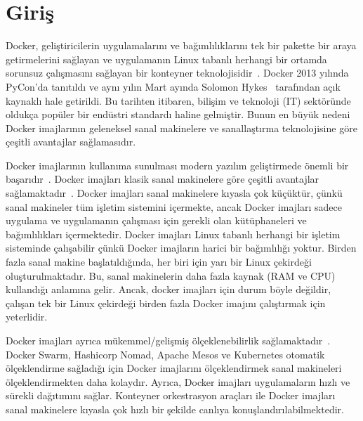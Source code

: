 

\chapter{Giriş}

Docker, geliştiricilerin uygulamalarını ve bağımlılıklarını tek bir pakette bir araya getirmelerini sağlayan ve uygulamanın Linux tabanlı herhangi bir ortamda sorunsuz çalışmasını sağlayan bir konteyner teknolojisidir~\autocite{haque2020challenges}. Docker 2013 yılında PyCon'da tanıtıldı ve aynı yılın Mart ayında Solomon Hykes~\autocite{ThefutureofLinuxContainers} tarafından açık kaynaklı hale getirildi. Bu tarihten itibaren, bilişim ve teknoloji (IT) sektöründe oldukça popüler bir endüstri standardı haline gelmiştir. Bunun en büyük nedeni Docker imajlarının geleneksel sanal makinelere ve sanallaştırma teknolojisine göre çeşitli avantajlar sağlamasıdır.

Docker imajlarının kullanıma sunulması modern yazılım geliştirmede  önemli bir başarıdır~\autocite{prado2022}. Docker imajları klasik sanal makinelere göre çeşitli avantajlar sağlamaktadır~\autocite{zhang2018comparative}. Docker imajları sanal makinelere kıyasla çok küçüktür, çünkü sanal makineler tüm işletim sistemini içermekte, ancak Docker imajları sadece uygulama ve uygulamanın çalışması için gerekli olan kütüphaneleri ve bağımlılıkları içermektedir. Docker imajları Linux tabanlı herhangi bir işletim sisteminde çalışabilir çünkü Docker imajların harici bir bağımlılığı yoktur. Birden fazla sanal makine başlatıldığında, her biri için yarı bir Linux çekirdeği oluşturulmaktadır. Bu, sanal makinelerin daha fazla kaynak (RAM ve CPU) kullandığı anlamına gelir. Ancak, docker imajları için durum böyle değildir, çalışan tek bir Linux çekirdeği birden fazla Docker imajını çalıştırmak için yeterlidir.

Docker imajları ayrıca mükemmel/gelişmiş ölçeklenebilirlik sağlamaktadır~\autocite{8125559}. Docker Swarm, Hashicorp Nomad, Apache Mesos ve Kubernetes otomatik ölçeklendirme sağladığı için Docker imajlarını ölçeklendirmek sanal makineleri ölçeklendirmekten daha kolaydır. Ayrıca, Docker imajları uygulamaların hızlı ve sürekli dağıtımını sağlar. Konteyner orkestrasyon araçları ile Docker imajları sanal makinelere kıyasla çok hızlı bir şekilde canlıya konuşlandırılabilmektedir.

